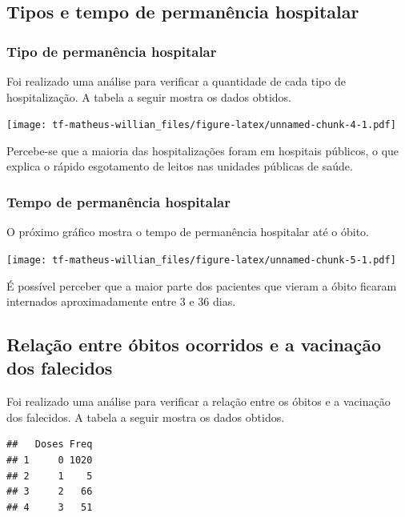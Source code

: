 \documentclass[
  brazilian,
]{article}
\begin{document}
\hypertarget{tipos-e-tempo-de-permanuxeancia-hospitalar}{%
\subsection{Tipos e tempo de permanência
hospitalar}\label{tipos-e-tempo-de-permanuxeancia-hospitalar}}

\hypertarget{tipo-de-permanuxeancia-hospitalar}{%
\subsubsection{Tipo de permanência
hospitalar}\label{tipo-de-permanuxeancia-hospitalar}}

Foi realizado uma análise para verificar a quantidade de cada tipo de
hospitalização. A tabela a seguir mostra os dados obtidos.

\texttt{[image: tf-matheus-willian\_files/figure-latex/unnamed-chunk-4-1.pdf]}

Percebe-se que a maioria das hospitalizações foram em hospitais
públicos, o que explica o rápido esgotamento de leitos nas unidades
públicas de saúde.

\hypertarget{tempo-de-permanuxeancia-hospitalar}{%
\subsubsection{Tempo de permanência
hospitalar}\label{tempo-de-permanuxeancia-hospitalar}}

O próximo gráfico mostra o tempo de permanência hospitalar até o óbito.

\texttt{[image: tf-matheus-willian\_files/figure-latex/unnamed-chunk-5-1.pdf]}

É possível perceber que a maior parte dos pacientes que vieram a óbito
ficaram internados aproximadamente entre 3 e 36 dias.

\hypertarget{relauxe7uxe3o-entre-uxf3bitos-ocorridos-e-a-vacinauxe7uxe3o-dos-falecidos}{%
\subsection{Relação entre óbitos ocorridos e a vacinação dos
falecidos}\label{relauxe7uxe3o-entre-uxf3bitos-ocorridos-e-a-vacinauxe7uxe3o-dos-falecidos}}

Foi realizado uma análise para verificar a relação entre os óbitos e a
vacinação dos falecidos. A tabela a seguir mostra os dados obtidos.

\begin{verbatim}
##   Doses Freq
## 1     0 1020
## 2     1    5
## 3     2   66
## 4     3   51
\end{verbatim}
\end{document}

